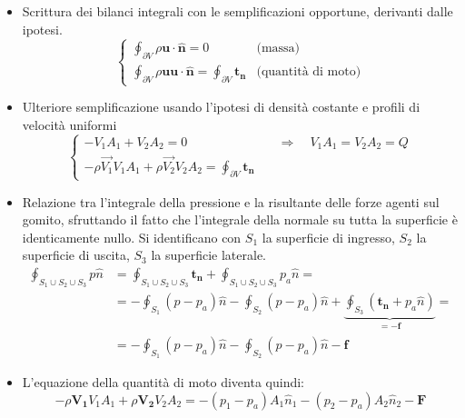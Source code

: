 \begin{itemize}
  \item Scrittura dei bilanci integrali con le semplificazioni opportune, derivanti dalle ipotesi.
    \begin{equation}
     \begin{cases}
      \oint_{\partial V} \rho \bm{u} \cdot \hat{\bm{n}} = 0  & \text{(massa)} \\
      \oint_{\partial V} \rho \bm{u} \bm{u} \cdot \hat{\bm{n}} = \oint_{\partial V} \bm{t_n} & \text{(quantità di moto)}
     \end{cases}
    \end{equation}
  \item Ulteriore semplificazione usando l'ipotesi di densità costante e profili di velocità uniformi
    \begin{equation}
     \begin{cases}
      -V_1 A_1 + V_2 A_2 = 0  & \quad \Rightarrow \quad V_1 A_1 = V_2 A_2 = Q \\
      - \rho \vec{V_1} V_1 A_1 + \rho \vec{V_2} V_2 A_2 = \oint_{\partial V} \bm{t_n}
     \end{cases}
    \end{equation}
  \item Relazione tra l'integrale della pressione e la risultante delle forze agenti sul gomito, sfruttando il fatto che l'integrale della normale su tutta la superficie è identicamente nullo. Si identificano con $S_1$ la superficie di ingresso, $S_2$ la superficie di uscita, $S_3$ la superficie laterale.
    \begin{equation}
     \begin{aligned}
      \displaystyle\oint_{S_1\cup S_2\cup S_3} p \hat{n} & =  \displaystyle\oint_{S_1\cup S_2\cup S_3} \bm{t_n} + \displaystyle\oint_{S_1\cup S_2\cup S_3} p_a \hat{n} = \\
      & = -\oint_{S_1} (p-p_a) \hat{n} - \oint_{S_2} (p-p_a) \hat{n} + \underbrace{\oint_{S_3} (\bm{t_n}+p_a\hat{n})}_{=-\bm{f}}  =  \\
      & = -\oint_{S_1} (p-p_a) \hat{n} - \oint_{S_2} (p-p_a) \hat{n} - \bm{f}
     \end{aligned}
    \end{equation}
  \item L'equazione della quantità di moto diventa quindi:
  \begin{equation}
  - \rho \bm{V_1} V_1 A_1 + \rho \bm{V_2} V_2 A_2 = - (p_1 - p_a) A_1 \hat{n}_1 - (p_2 - p_a) A_2 \hat{n}_2 - \bm{F}
  \end{equation}

\end{itemize}
